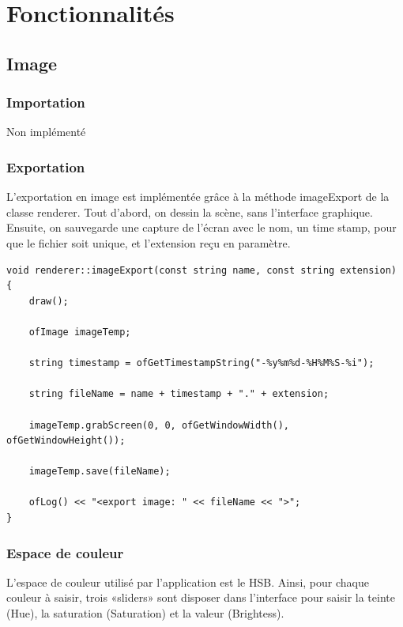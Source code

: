 \newcommand\tab[1][1cm]{\hspace*{#1}}

\chapter{Fonctionnalités}
\label{s:fonctionnalite}

\section{Image}
\subsection{Importation}
Non implémenté

\subsection{Exportation}
L'exportation en image est implémentée grâce à la méthode imageExport de la classe renderer. Tout d’abord, on dessin la scène, sans l’interface graphique. Ensuite, on sauvegarde une capture de l’écran avec le nom, un time stamp, pour que le fichier soit unique, et l’extension reçu en paramètre.\\

\begin{lstlisting}
void renderer::imageExport(const string name, const string extension)
{
	draw();
	
	ofImage imageTemp;
	
	string timestamp = ofGetTimestampString("-%y%m%d-%H%M%S-%i");
	
	string fileName = name + timestamp + "." + extension;
	
	imageTemp.grabScreen(0, 0, ofGetWindowWidth(), ofGetWindowHeight());
	
	imageTemp.save(fileName);
	
	ofLog() << "<export image: " << fileName << ">";
}
\end{lstlisting}


\subsection{Espace de couleur}
 L'espace de couleur utilisé par l'application est le HSB. Ainsi, pour chaque couleur à saisir, trois «sliders» sont disposer dans l'interface pour saisir la teinte (Hue), la saturation (Saturation) et la valeur (Brightess).\\
 
